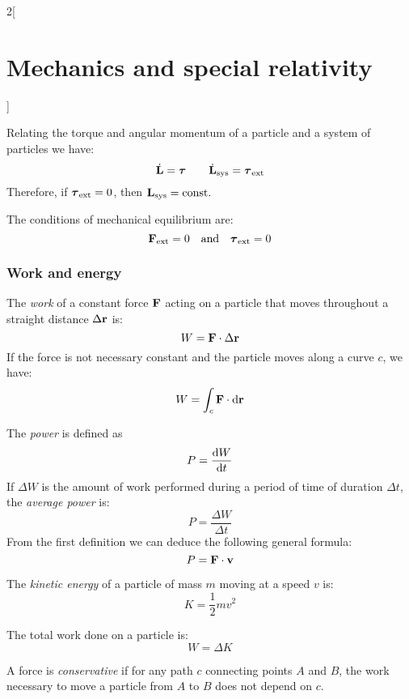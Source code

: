 \documentclass[../../../main.tex]{subfiles}
\begin{document}
\begin{multicols}{2}[\section{Mechanics and special relativity}]
\begin{prop}[Torque]
    \end{prop}
    \begin{prop}
        Relating the torque and angular momentum of a particle and a system of particles we have:
        $$\dot{\boldsymbol{\mathrm{L}}}=\vb*{\tau}\qquad\dot{\boldsymbol{\mathrm{L}}}_\text{sys}=\vb*{\tau}_\text{ext}$$ Therefore, if $\vb*{\tau}_\text{ext}=0$, then $\boldsymbol{\mathrm{L}}_\text{sys}=\text{const}.$
    \end{prop}
    \begin{definition}
        The conditions of mechanical equilibrium are: $$\boldsymbol{\mathrm{F}}_\text{ext}=0\quad\text{and}\quad\vb*{\tau}_\text{ext}=0$$
    \end{definition}
    \subsubsection*{Work and energy}
    \begin{definition}[Work]
        The \textit{work} of a constant force $\boldsymbol{\mathrm{F}}$ acting on a particle that moves throughout a straight distance $\Delta\boldsymbol{\mathrm{r}}$ is: $$ W=\boldsymbol{\mathrm{F}}\cdot\Delta\boldsymbol{\mathrm{r}}$$ If the force is not necessary constant and the particle moves along a curve $c$, we have: $$W=\int_c\boldsymbol{\mathrm{F}}\cdot \dd\boldsymbol{\mathrm{r}}$$
    \end{definition}
    \begin{definition}[Power]
        The \textit{power} is defined as $$P=\dv{W}{t}$$ If $\Delta W$ is the amount of work performed during a period of time of duration $\Delta t$, the \textit{average power} is: $$P=\frac{\Delta W}{\Delta t}$$ From the first definition we can deduce the following general formula: $$P=\boldsymbol{\mathrm{F}}\cdot\boldsymbol{\mathrm{v}}$$
    \end{definition}
    \begin{definition}
        The \textit{kinetic energy} of a particle of mass $m$ moving at a speed $v$ is: $$K=\frac{1}{2}mv^2$$
    \end{definition}
    \begin{theorem}
        The total work done on a particle is:
        $$W=\Delta K$$
    \end{theorem}
    \begin{definition}
        A force is \textit{conservative} if for any path $c$ connecting points $A$ and $B$, the work necessary to move a particle from $A$ to $B$ does not depend on $c$.
    \end{definition}

\end{multicols}
\end{document}
